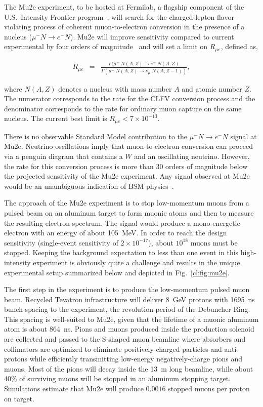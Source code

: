 

\label{cl:sec:mu2e}

The Mu2e experiment, to be hosted at Fermilab, a flagship component
of the U.S.\ Intensity Frontier program~\cite{IF_review}, will
search for the charged-lepton-flavor-violating process of coherent
muon-to-electron conversion in the presence of a nucleus ($\mu^-N
\rightarrow e^-N$).  Mu2e will improve sensitivity
compared to current experimental by four orders of
magnitude~\cite{Mu2eCDR} and will set a limit on $R_{\mu e}$, defined
as,

%
\begin{eqnarray}
  R_{\mu e} &=& \frac
  {\Gamma(\mu^{-}\;  N(A,Z) \to e^{-}\; N(A,Z)}  {\Gamma(\mu^{-}\; N(A,Z)\to \nu_{\mu}\; N(A,Z-1))},\end{eqnarray}
%

where $N(A,Z)$ denotes a nucleus with mass number $A$ and atomic
number $Z$.  The numerator corresponds to the rate for the CLFV
conversion process and the denominator corresponds to the rate for
ordinary muon capture on the same nucleus.  The current best limit is
$R_{\mu{}e}<7\times10^{-13}$\cite{Bertl:2006up}.

There is no observable Standard Model contribution to the $\mu^-N
\rightarrow e^-N$ signal at Mu2e.  Neutrino oscillations imply that
muon-to-electron conversion can proceed via a penguin diagram that
contains a $W$ and an oscillating neutrino. However, the rate for this
conversion process is more than 30 orders of magnitude below the
projected sensitivity of the Mu2e experiment.  Any signal observed at
Mu2e would be an unambiguous indication of BSM
physics~\cite{Marciano:2008zz,deGouvea:2013zba}.

The approach of the Mu2e experiment is to stop low-momentum muons from
a pulsed beam on an aluminum target to form muonic atoms and then to
measure the resulting electron spectrum.  The signal would produce a
mono-energetic electron with an energy of about 105~MeV.  In order to
reach the design sensitivity (single-event sensitivity of $2\times
10^{-17}$), about $10^{18}$ muons must be stopped.  Keeping the
background expectation to less than one event in this high-intensity
experiment is obviously quite a challenge and results in the unique
experimental setup summarized below and depicted in
Fig.~\ref{cl:fig:mu2e}.

The first step in the experiment is to produce the low-momentum pulsed
muon beam.  Recycled Tevatron infrastructure will deliver 8~GeV
protons with 1695~ns bunch spacing to the experiment, the
revolution period of the Debuncher Ring. This spacing is well-suited to Mu2e, given that the lifetime of a muonic aluminum atom is about
864~ns.  Pions and muons produced inside the production solenoid are
collected and passed to the S-shaped muon beamline where absorbers and
collimators are optimized to eliminate positively-charged particles
and anti-protons while efficiently transmitting low-energy
negatively-charge pions and muons.  Most of the pions will decay
inside the 13~m long beamline, while about 40\% of surviving muons
will be stopped in an aluminum stopping target.  Simulations estimate
that Mu2e will produce $0.0016$ stopped muons per proton on target.



